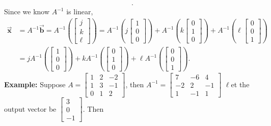 \documentclass{report}
\begin{document}
\begin{itemize}
\begin{align*}
        .\end{align*}
        Since we know $A^{-1}$ is linear, 
        \begin{align*}
            \vec{\mathbf{x}} &=A^{-1}\vec{\mathbf{b}} = A^{-1}\left(\begin{bmatrix} j \\ k \\ \ell \end{bmatrix}\right) = A^{-1}\left(j\begin{bmatrix} 1 \\ 0 \\ 0 \end{bmatrix}\right) + A^{-1}\left(k \begin{bmatrix} 0 \\ 1 \\ 0 \end{bmatrix}\right) +  A^{-1}\left(\ell\begin{bmatrix} 0 \\ 0 \\ 1\end{bmatrix}\right) \\
                                                                                                     &=jA^{-1}\left(\begin{bmatrix} 1 \\ 0 \\ 0 \end{bmatrix}\right) + kA^{-1}\left( \begin{bmatrix} 0 \\ 1 \\ 0 \end{bmatrix}\right) + \ell A^{-1}\left(\begin{bmatrix} 0 \\ 0 \\ 1\end{bmatrix}\right) 
        .\end{align*}
        \bigbreak \noindent 
        \textbf{Example:} Suppose $A = \begin{bmatrix} 1 & 2 & -2 \\ 1 & 3 & -1 \\ 0 & 1 & 2\end{bmatrix} $, then $A^{-1} = \begin{bmatrix} 7 & -6& 4 \\ -2 & 2 & -1 \\ 1 & -1 & 1 \end{bmatrix} $
        \bigbreak \noindent 
        $\ell$et the output vector be $\begin{bmatrix} 3 \\ 0 \\ -1 \end{bmatrix} $. Then

\end{itemize}
\end{document}
